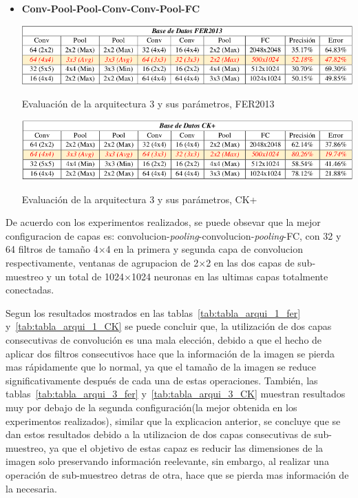 \begin{itemize}
{}

\item {\textbf{Conv-Pool-Pool-Conv-Conv-Pool-FC}

\begin{table}[H]
    \centering
    \includegraphics[width=140mm]{./Imagenes/tabla_arqui_3_fer.png} 
    \caption{Evaluación de la arquitectura 3 y sus parámetros, FER2013}
    \label{tab:tabla_arqui_3_fer}
\end{table}

\begin{table}[H]
    \centering
    \includegraphics[width=140mm]{./Imagenes/tabla_arqui_3_CK.png}
    \caption{Evaluación de la arquitectura 3 y sus parámetros, CK+}
    \label{tab:tabla_arqui_3_CK}
\end{table}
}
\end{itemize}

De acuerdo con los experimentos realizados, se puede obsevar que la mejor configuracion de capas es: convolucion-\textit{pooling}-convolucion-\textit{pooling}-FC, con 32 y 64 filtros de tamaño 4$\times$4 en la primera y segunda capa de convolucion respectivamente, ventanas de agrupacion de 2$\times$2 en las dos capas de sub-muestreo y un total de 1024$\times$1024 neuronas en las ultimas capas totalmente conectadas.

Segun los resultados mostrados en las tablas~\ref{tab:tabla_arqui_1_fer} y~\ref{tab:tabla_arqui_1_CK} se puede concluir que, la utilización de dos capas consecutivas de convolución es una mala elección, debido a que el hecho de aplicar dos filtros consecutivos hace que la información de la imagen se pierda mas rápidamente que lo normal, ya que el tamaño de la imagen se reduce significativamente después de cada una de estas operaciones. También, las tablas~\ref{tab:tabla_arqui_3_fer} y~\ref{tab:tabla_arqui_3_CK} muestran resultados muy por debajo de la segunda configuración(la mejor obtenida en los experimentos realizados), similar que la explicacion anterior, se concluye que se dan estos resultados debido a la utilizacion de dos capas consecutivas de sub-muestreo, ya que el objetivo de estas capaz es reducir las dimensiones de la imagen solo preservando información reelevante, sin embargo, al realizar una operación de sub-muestreo detras de otra, hace que se pierda mas información de la necesaria. 

